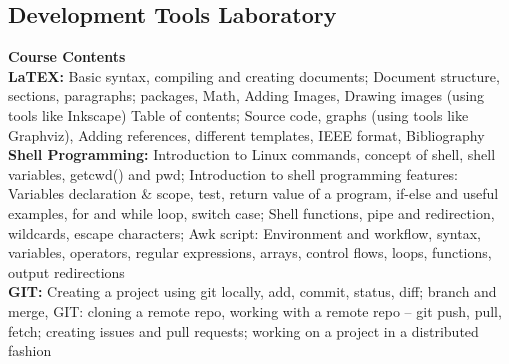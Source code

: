 \documentclass[12pt]{article}
\begin{document}
\subsection{Development Tools Laboratory}
\vspace{5pt}
\textbf{Course Contents} \\[5pt] 
\textbf{LaTEX:} Basic syntax, compiling and creating documents; Document structure, sections, 
paragraphs; packages, Math, Adding Images, Drawing images (using tools like Inkscape) Table 
of contents; Source code, graphs (using tools like Graphviz), Adding references, different 
templates, IEEE format, Bibliography
\\[5pt]
\textbf{Shell Programming:} Introduction to Linux commands, concept of shell, shell variables, 
getcwd() and pwd; Introduction to shell programming features: Variables declaration \& scope, 
test, return value of a program, if-else and useful examples, for and while loop, switch case; 
Shell functions, pipe and redirection, wildcards, escape characters; Awk script: Environment and 
workflow, syntax, variables, operators, regular expressions, arrays, control flows, loops, 
functions, output redirections
\\[5pt]
\textbf{GIT:} Creating a project using git locally, add, commit, status, diff; branch and merge, GIT: 
cloning a remote repo, working with a remote repo – git push, pull, fetch; creating issues and pull 
requests; working on a project in a distributed fashion
\vspace{1cm}
\end{document}
